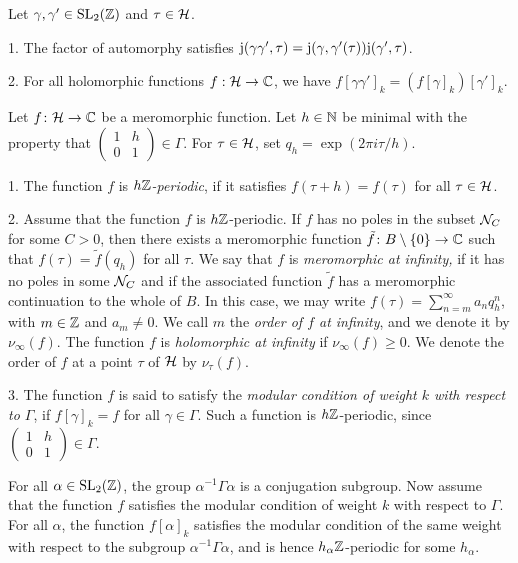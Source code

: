 \begin{remark}
 Let $\gamma,\gamma'\in\operatorname{SL}_2(\mathbb{Z})$ and $\tau\in\mathcal{H}$.
 
 1. The factor of automorphy satisfies $\mathrm{j}(\gamma\gamma',\tau) = \mathrm{j}(\gamma,\gamma'(\tau))\mathrm{j}(\gamma',\tau)$.
 
 2. For all holomorphic functions $f:\mathcal{H}\to\mathbb{C}$, we have $f[\gamma\gamma']_k=(f[\gamma]_k)[\gamma']_k$.
\end{remark}

\begin{defi}
 Let $f\colon \mathcal{H} \to \mathbb{C}$ be a meromorphic function. Let $h\in\mathbb{N}$ be minimal with the property that $\left(\begin{smallmatrix}1 & h\\0 & 1\end{smallmatrix}\right)\in\Gamma$. For $\tau\in\mathcal{H}$, set $q_h=\exp(2\pi i\tau/h)$.
 
  1. The function $f$ is \emph{$h\mathbb{Z}$-periodic}, if it satisfies $f(\tau+h)=f(\tau)$ for all $\tau\in\mathcal{H}$.

  2. Assume that the function $f$ is $h\mathbb{Z}$-periodic. If $f$ has no poles in the subset $\mathcal{N}_C$ for some $C>0$, then there exists a meromorphic function $\tilde f\colon B\setminus \{0\} \to \mathbb{C}$ such that $f(\tau)=\tilde f(q_h)$ for all $\tau$. We say that $f$ is \emph{meromorphic at infinity,} if it has no poles in some $\mathcal{N}_C$ and if the associated function $\tilde f$ has a meromorphic continuation to the whole of $B$. In this case, we may write $f(\tau)=\sum_{n=m}^\infty a_n q_h^n$, with $m\in\mathbb{Z}$ and $a_m\neq 0$. We call $m$ the \emph{order of $f$ at infinity}, and we denote it by $\nu_\infty(f)$. The function $f$ is \emph{holomorphic at infinity} if $\nu_\infty(f)\geq 0$. We denote the order of $f$ at a point $\tau$ of $\mathcal{H}$ by $\nu_\tau(f)$.
  
  3. The function $f$ is said to satisfy the \emph{modular condition of weight $k$ with respect to $\Gamma$}, if $f[\gamma]_k=f$ for all $\gamma \in \Gamma$. Such a function is $h\mathbb{Z}$-periodic, since $\left(\begin{smallmatrix}1 & h\\0 & 1\end{smallmatrix}\right)\in\Gamma$.
  
  For all $\alpha\in\operatorname{SL}_2(\mathbb{Z})$, the group $\alpha^{-1}\Gamma\alpha$ is a conjugation subgroup. Now assume that the function $f$ satisfies the modular condition of weight $k$ with respect to $\Gamma$. For all $\alpha$, the function $f[\alpha]_k$ satisfies the modular condition of the same weight with respect to the subgroup $\alpha^{-1}\Gamma\alpha$, and is hence $h_\alpha\mathbb{Z}$-periodic for some $h_\alpha$.
  

\end{defi}
